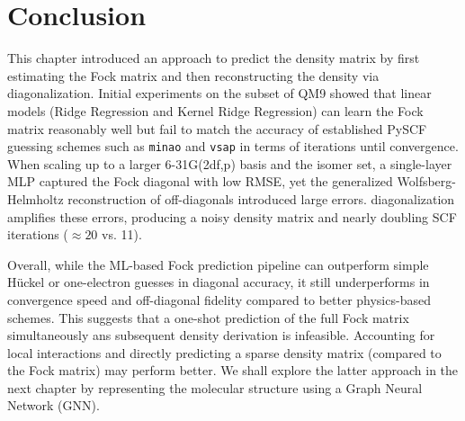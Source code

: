 \section{Conclusion}
\label{sec:fock_matrix_prediction_conclusion}
This chapter introduced an approach to predict the density matrix by first estimating the Fock matrix and then reconstructing the density via diagonalization. Initial experiments on the  subset of QM9 showed that linear models (Ridge Regression and Kernel Ridge Regression) can learn the Fock matrix reasonably well but fail to match the accuracy of established PySCF guessing schemes such as \texttt{minao} and \texttt{vsap} in terms of iterations until convergence. When scaling up to a larger 6-31G(2df,p) basis and the  isomer set, a single-layer MLP captured the Fock diagonal with low RMSE, yet the generalized Wolfsberg-Helmholtz reconstruction of off-diagonals introduced large errors. diagonalization amplifies these errors, producing a noisy density matrix and nearly doubling SCF iterations ($\approx20$ vs. 11).

Overall, while the ML-based Fock prediction pipeline can outperform simple Hückel or one-electron guesses in diagonal accuracy, it still underperforms in convergence speed and off-diagonal fidelity compared to better physics-based schemes. This suggests that a one-shot prediction of the full Fock matrix simultaneously ans subsequent density derivation is infeasible. Accounting for local interactions and directly predicting a sparse density matrix (compared to the Fock matrix) may perform  better. We shall explore the latter approach in the next chapter by representing the molecular structure using a Graph Neural Network (GNN). 

